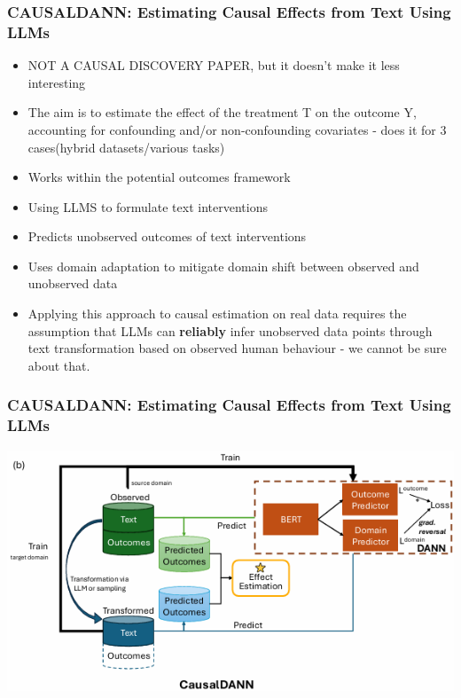 \documentclass[t,24pt,aspectratio=169]{beamer}
\begin{document}
\begin{frame}[hoved]
\frametitle{CAUSALDANN: Estimating Causal Effects from Text Using LLMs \cite{guo2025estimatingcausaleffectstext}}
        \begin{itemize}
            \item NOT A CAUSAL DISCOVERY PAPER, but it doesn't make it less interesting
            \item The aim is to estimate the effect of the treatment T on the outcome Y, accounting for confounding and/or non-confounding covariates - does it for 3 cases(hybrid datasets/various tasks)
            \item Works within the potential outcomes framework
            \item Using LLMS to formulate text interventions
            \item Predicts unobserved outcomes of text interventions
            \item Uses domain adaptation to mitigate domain shift between observed and unobserved data
            \item  Applying this approach to causal estimation on real data requires the assumption that LLMs can \textbf{reliably } infer unobserved data points through text transformation based on observed human behaviour - we cannot be sure about that.
        \end{itemize}
\end{frame}

\begin{frame}[hoved]
\frametitle{CAUSALDANN: Estimating Causal Effects from Text Using LLMs \cite{guo2025estimatingcausaleffectstext}}
\includegraphics{Presentations/Week2gr/DANN.png}
\end{frame}
\end{document}
